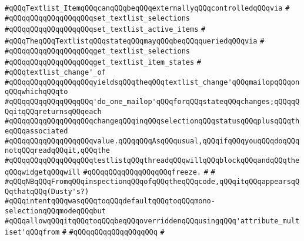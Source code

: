 \verb|#qQQqTextlist_ItemqQQqcanqQQqbeqQQqexternallyqQQqcontrolledqQQqvia|\newline
\verb|#|\newline
\verb|#qQQqqQQqqQQqqQQqqQQqset_textlist_selections|\newline
\verb|#qQQqqQQqqQQqqQQqqQQqset_textlist_active_items|\newline
\verb|#|\newline
\verb|#qQQqTheqQQqTextlistqQQqstateqQQqmayqQQqbeqQQqqueriedqQQqvia|\newline
\verb|#|\newline
\verb|#qQQqqQQqqQQqqQQqqQQqget_textlist_selections|\newline
\verb|#qQQqqQQqqQQqqQQqqQQqget_textlist_item_states|\newline
\verb|#|\newline
\verb|#qQQqtextlist_change'_of|\newline
\verb|#qQQqqQQqqQQqqQQqqQQqyieldsqQQqtheqQQqtextlist_change'qQQqmailopqQQqonqQQqwhichqQQqto|\newline
\verb|#qQQqqQQqqQQqqQQqqQQq'do_one_mailop'qQQqforqQQqstateqQQqchanges;qQQqqQQqitqQQqreturnsqQQqeach|\newline
\verb|#qQQqqQQqqQQqqQQqqQQqchangeqQQqinqQQqselectionqQQqstatusqQQqplusqQQqtheqQQqassociated|\newline
\verb|#qQQqqQQqqQQqqQQqqQQqvalue.qQQqqQQqAsqQQqusual,qQQqifqQQqyouqQQqdoqQQqnotqQQqreadqQQqit,qQQqthe|\newline
\verb|#qQQqqQQqqQQqqQQqqQQqtestlistqQQqthreadqQQqwillqQQqblockqQQqandqQQqtheqQQqwidgetqQQqwill|\newline
\verb|#qQQqqQQqqQQqqQQqqQQqfreeze.|\newline
\verb|#|\newline
\verb|#|\newline
\verb|#qQQqNBqQQqFromqQQqinspectionqQQqofqQQqtheqQQqcode,qQQqitqQQqappearsqQQqthatqQQq(Dusty's?)|\newline
\verb|#qQQqintentqQQqwasqQQqtoqQQqdefaultqQQqtoqQQqmono-selectionqQQqmodeqQQqbut|\newline
\verb|#qQQqallowqQQqitqQQqtoqQQqbeqQQqoverriddenqQQqusingqQQq'attribute_multiset'qQQqfrom|\newline
\verb|#|\newline
\verb|#qQQqqQQqqQQqqQQqqQQq|\newline
\verb|#|\newline
